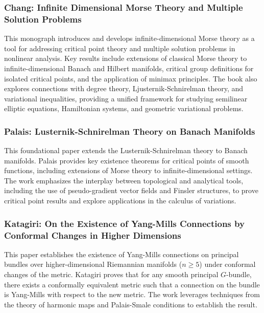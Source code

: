 \documentclass[10pt, letterpaper]{article}
\theoremstyle{custom}
\theoremstyle{definition}
\begin{document}
\subsubsection{Chang: Infinite Dimensional Morse Theory and Multiple Solution Problems \cite{chang1993morse}} 
This monograph introduces and develops infinite-dimensional Morse theory as a tool for addressing critical point theory and multiple solution problems in nonlinear analysis. Key results include extensions of classical Morse theory to infinite-dimensional Banach and Hilbert manifolds, critical group definitions for isolated critical points, and the application of minimax principles. The book also explores connections with degree theory, Ljusternik-Schnirelman theory, and variational inequalities, providing a unified framework for studying semilinear elliptic equations, Hamiltonian systems, and geometric variational problems.


\subsubsection{Palais: Lusternik-Schnirelman Theory on Banach Manifolds \cite{palais1966lusternik}} 
This foundational paper extends the Lusternik-Schnirelman theory to Banach manifolds. Palais provides key existence theorems for critical points of smooth functions, including extensions of Morse theory to infinite-dimensional settings. The work emphasizes the interplay between topological and analytical tools, including the use of pseudo-gradient vector fields and Finsler structures, to prove critical point results and explore applications in the calculus of variations.


\subsubsection{Katagiri: On the Existence of Yang-Mills Connections by Conformal Changes in Higher Dimensions \cite{katagiri1994existence}} 
This paper establishes the existence of Yang-Mills connections on principal bundles over higher-dimensional Riemannian manifolds (\(n \geq 5\)) under conformal changes of the metric. Katagiri proves that for any smooth principal \(G\)-bundle, there exists a conformally equivalent metric such that a connection on the bundle is Yang-Mills with respect to the new metric. The work leverages techniques from the theory of harmonic maps and Palais-Smale conditions to establish the result.
\end{document}

